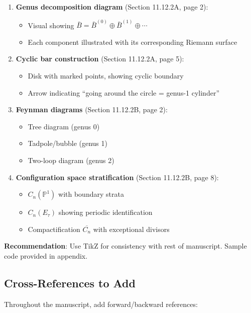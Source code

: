 \begin{enumerate}
\item \textbf{Genus decomposition diagram} (Section 11.12.2A, page 2):
  \begin{itemize}
  \item Visual showing $\bar{B} = \bar{B}^{(0)} \oplus \bar{B}^{(1)} \oplus \cdots$
  \item Each component illustrated with its corresponding Riemann surface
  \end{itemize}

\item \textbf{Cyclic bar construction} (Section 11.12.2A, page 5):
  \begin{itemize}
  \item Disk with marked points, showing cyclic boundary
  \item Arrow indicating ``going around the circle = genus-1 cylinder''
  \end{itemize}

\item \textbf{Feynman diagrams} (Section 11.12.2B, page 2):
  \begin{itemize}
  \item Tree diagram (genus 0)
  \item Tadpole/bubble (genus 1)
  \item Two-loop diagram (genus 2)
  \end{itemize}

\item \textbf{Configuration space stratification} (Section 11.12.2B, page 8):
  \begin{itemize}
  \item $C_n(\mathbb{P}^1)$ with boundary strata
  \item $C_n(E_\tau)$ showing periodic identification
  \item Compactification $\overline{C_n}$ with exceptional divisors
  \end{itemize}
\end{enumerate}

\textbf{Recommendation}: Use TikZ for consistency with rest of manuscript. Sample code provided in appendix.

\subsection{Cross-References to Add}

Throughout the manuscript, add forward/backward references:

